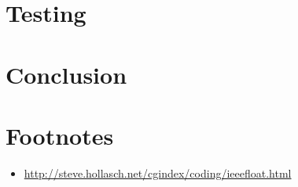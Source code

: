 \documentclass[11pt]{article}
\begin{document}
\section{Testing}



\section{Conclusion}

\section*{Footnotes}
\begin{itemize}
\item \url{http://steve.hollasch.net/cgindex/coding/ieeefloat.html}
\end{itemize}
\appendix
\begin{appendices}

\end{appendices}
\end{document}
